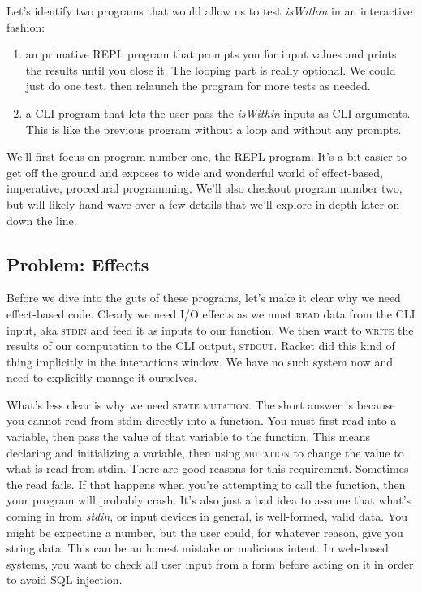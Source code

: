 \documentclass[]{tufte-handout}
\begin{document}
Let's identify two programs that would allow us to test \textit{isWithin} in an interactive fashion:
\begin{enumerate}
\item an primative REPL program that prompts you for input values and prints the results until you close it. The looping part is really optional. We could just do one test, then relaunch the program for more tests as needed.
\item a CLI program that lets the user pass the \textit{isWithin} inputs as CLI arguments. This is like the previous program without a loop and without any prompts. 
\end{enumerate}

We'll first focus on program number one, the REPL program. It's a bit easier to get off the ground and exposes to wide and wonderful world of effect-based, imperative, procedural programming. We'll also checkout program number two, but will likely hand-wave over a few details that we'll explore in depth later on down the line.

\subsection{Problem: Effects}

Before we dive into the guts of these programs, let's make it clear why we need effect-based code. Clearly we need \textsc{I/O} effects as we must \textsc{read} data from the CLI input, aka \textsc{stdin} and feed it as inputs to our function.  We then want to \textsc{write} the results of our computation to the CLI output, \textsc{stdout}.  Racket did this kind of thing implicitly in the interactions window. We have no such system now and need to explicitly manage it ourselves. 

What's less clear is why we need \textsc{state mutation}. The short answer is because you cannot read from stdin directly into a function. You must first read into a variable, then pass the value of that variable to the function.  This means declaring and initializing a variable, then using \textsc{mutation} to change the value to what is read from stdin. There are good reasons for this requirement. Sometimes the read fails. If that happens when you're attempting to call the function, then your program will probably crash. It's also just a bad idea to assume that what's coming in from \textit{stdin}, or input devices in general, is well-formed, valid data. You might be expecting a number, but the user could, for whatever reason, give you string data. This can be an honest mistake or malicious intent. In web-based systems, you want to check all user input from a form before acting on it in order to avoid SQL injection. 
\end{document}
